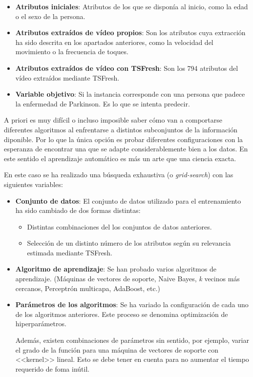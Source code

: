 \begin{itemize}
    \item \textbf{Atributos iniciales}: Atributos de los que se disponía al
    inicio, como la edad o el sexo de la persona.
    \item \textbf{Atributos extraídos de vídeo propios}: Son los atributos cuya
    extracción ha sido descrita en los apartados anteriores, como la velocidad
    del movimiento o la frecuencia de toques.
    \item \textbf{Atributos extraídos de vídeo con TSFresh}: Son los 794
    atributos del vídeo extraídos mediante TSFresh.
    \item \textbf{Variable objetivo}: Si la instancia corresponde con una
    persona que padece la enfermedad de Parkinson. Es lo que se intenta predecir.
\end{itemize}

A priori es muy difícil o incluso imposible saber cómo van a comportarse
diferentes algoritmos al enfrentarse a distintos subconjuntos de la información
diponible. Por lo que la única opción es probar diferentes configuraciones con
la esperanza de encontrar una que se adapte considerablemente bien a los datos.
En este sentido el aprendizaje automático es más un arte que una ciencia exacta.

En este caso se ha realizado una búsqueda exhaustiva (o \textit{grid-search})
con las siguientes variables:

\begin{itemize}
    \item \textbf{Conjunto de datos}: El conjunto de datos utilizado para el
    entrenamiento ha sido cambiado de dos formas distintas:
    \begin{itemize}
        \item Distintas combinaciones del los conjuntos de datos anteriores.
        \item Selección de un distinto número de los atributos según su
        relevancia estimada mediante TSFresh.
    \end{itemize}
    \item \textbf{Algoritmo de aprendizaje}: Se han probado varios algoritmos de
    aprendizaje. (Máquinas de vectores de soporte, Naive Bayes, \textit{k}
    vecinos más cercanos, Perceptrón multicapa, AdaBoost, etc.)
    \item \textbf{Parámetros de los algoritmos}: Se ha variado la configuración
    de cada uno de los algoritmos anteriores. Este proceso se denomina
    optimización de hiperparámetros.
    
    Además, existen combinaciones de parámetros sin sentido, por ejemplo, variar
    el grado de la función para una máquina de vectores de soporte con
    <<kernel>> lineal. Esto se debe tener en cuenta para no aumentar el tiempo
    requerido de foma inútil.
\end{itemize}


